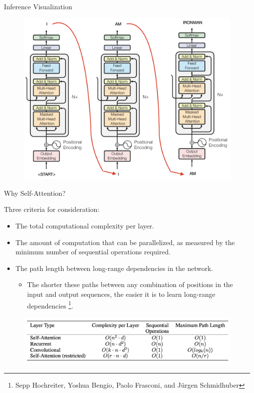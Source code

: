 \documentclass{beamer}
\begin{document}
\begin{frame}{Inference Visualization}

\begin{figure}\renewcommand{\thefootnote}{}
    \centering
    \includegraphics[width=0.8\linewidth]{f18.png}
    \label{fig:enter-label}
\end{figure}
    
\end{frame}

\begin{frame}{Why Self-Attention?}

Three criteria for consideration:
\begin{itemize}
    \item The total computational complexity per layer. 
    \item The amount of computation that can be parallelized, as measured by the minimum number of sequential operations required.
    \item The path length between long-range dependencies in the network.
    \begin{itemize}
        \item The shorter these paths between any combination of positions in the input and output sequences, the easier it is to learn long-range dependencies \footnote{Sepp Hochreiter, Yoshua Bengio, Paolo Frasconi, and Jürgen Schmidhuber}.
    \end{itemize}
\end{itemize}

\begin{figure}[htbp]
    \centering
    \includegraphics[width=1\linewidth]{f19.png}
    \label{fig:enter-label}
\end{figure}
\end{frame}
\end{document}
